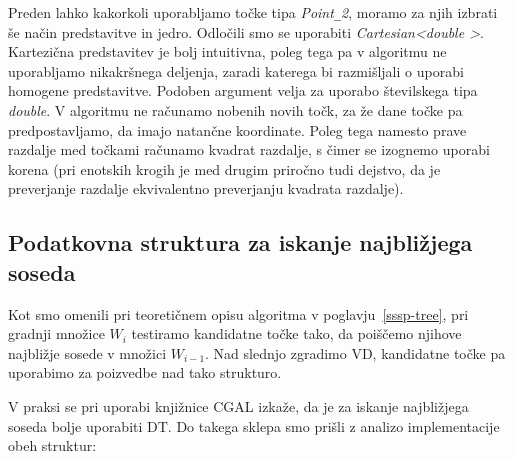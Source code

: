 \documentclass[a4paper, 12pt]{book}
\newcommand{\U}{\texttt{\_}}
\begin{document}
Preden lahko kakorkoli uporabljamo točke tipa \textit{Point\U 2}, moramo za njih izbrati še način predstavitve in jedro. Odločili smo se uporabiti \textit{Cartesian\textless double \textgreater}. Kartezična predstavitev je bolj intuitivna, poleg tega pa v algoritmu ne uporabljamo nikakršnega deljenja, zaradi katerega bi razmišljali o uporabi homogene predstavitve. Podoben argument velja za uporabo številskega tipa \textit{double}. V algoritmu ne računamo nobenih novih točk, za že dane točke pa predpostavljamo, da imajo natančne koordinate. Poleg tega namesto prave razdalje med točkami računamo kvadrat razdalje, s čimer se izognemo uporabi korena (pri enotskih krogih je med drugim priročno tudi dejstvo, da je preverjanje razdalje ekvivalentno preverjanju kvadrata razdalje).

\subsection{Podatkovna struktura za iskanje najbližjega soseda}
\label{why dt}

Kot smo omenili pri teoretičnem opisu algoritma v poglavju~\ref{sssp-tree}, pri gradnji množice $W_i$ testiramo kandidatne točke tako, da poiščemo njihove najbližje sosede v množici $W_{i-1}$. Nad slednjo zgradimo VD, kandidatne točke pa uporabimo za poizvedbe nad tako strukturo.

V praksi se pri uporabi knjižnice CGAL izkaže, da je za iskanje najbližjega soseda bolje uporabiti DT. Do takega sklepa smo prišli z analizo implementacije obeh struktur:
\end{document}

